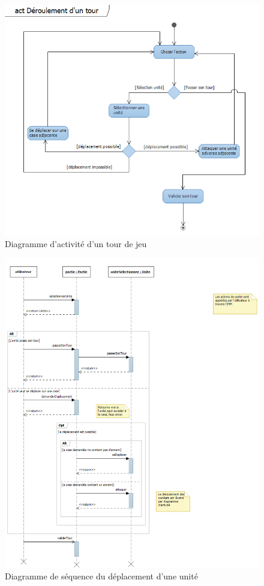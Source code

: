 \documentclass[a4paper]{article}%
\begin{document}
\begin{figure}[H]
    \centering
    \includegraphics[width=\textwidth]{./images/interaction/tourdejeu.png}
		\caption{Diagramme d'activité d'un tour de jeu}
		\label{fig:inter_tourdejeu}
\end{figure}

\begin{figure}[H]
    \centering
    \includegraphics[width=\textwidth]{./images/sequence/tourJeu.png}
		\caption{Diagramme de séquence du déplacement d'une unité}
		\label{fig:seq_tourJeu}
\end{figure}
\end{document}
